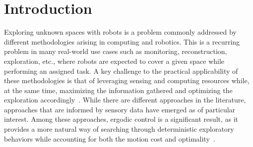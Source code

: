 \documentclass[letterpaper, 10 pt, conference, twoside]{IEEEtran}
\theoremstyle{definition}
\begin{document}
\section{Introduction}
\noindent
Exploring unknown %
spaces with robots is a problem commonly addressed by different methodologies arising in computing and robotics. This is a recurring problem in many real-world use cases such as monitoring, reconstruction, exploration, etc., where robots are expected to cover a given space while performing an assigned task. A key challenge to the practical applicability of these methodologies is that of leveraging sensing and computing resources while, at the same time, maximizing the information gathered and optimizing the exploration accordingly~\cite{popovic2020informative,schmid2020efficient}. 
%
While there are different approaches in the literature, approaches that are informed by sensory data have emerged as of particular interest. Among these approaches, ergodic control is a significant result, as it provides a more natural way of searching through deterministic exploratory behaviors while accounting for both the motion cost and optimality~\cite{miller2016ergodic}.
\end{document}
